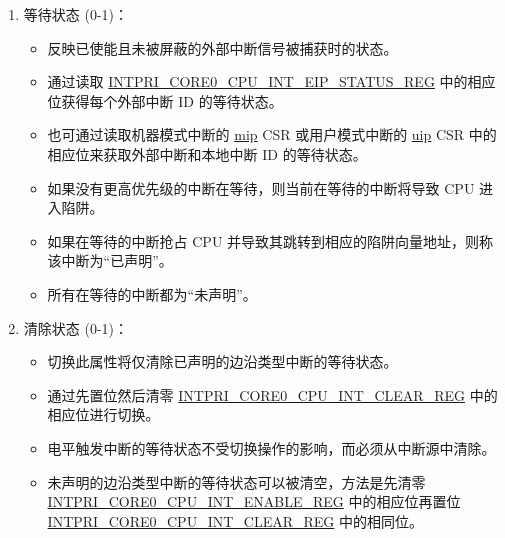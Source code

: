 \documentclass[main\_\_CN.tex]{subfiles}
\begin{document}
\begin{enumerate}
\begin{itemize}
        \item 通过写入外部中断 ID  的 \hyperref[regdesc:INTPRICORE0CPUINTPRINREG]{INTPRI\_CORE0\_CPU\_INT\_PRI\_\_REG} 进行配置。
        \item 优先级小于 \hyperref[regdesc:INTPRICORE0CPUINTTHRESHREG]{INTPRI\_CORE0\_CPU\_INT\_THRESH\_REG} 指定阈值的外部中断将被屏蔽。
        \item 优先级最低为 0，最高为 15。
        \item 具有相同优先级的中断通过其 ID 静态确定优先级，ID 越小，优先级越高。
        \item 本地 CLINT 中断具有静态的优先级，因此保留了相应的优先级寄存器。
        \item 本地 CLINT 中断在两种模式下均不会被优先级阈值屏蔽。
    \end{itemize}
    \item 等待状态 (0-1)：
    \begin{itemize}
        \item 反映已使能且未被屏蔽的外部中断信号被捕获时的状态。
        \item 通过读取 \hyperref[regdesc:INTPRICORE0CPUINTEIPSTATUSREG]{INTPRI\_CORE0\_CPU\_INT\_EIP\_STATUS\_REG} 中的相应位获得每个外部中断 ID 的等待状态。
        \item 也可通过读取机器模式中断的 \hyperref[regdesc:MIP]{mip} CSR 或用户模式中断的 \hyperref[regdesc:UIP]{uip} CSR 中的相应位来获取外部中断和本地中断 ID 的等待状态。
        \item 如果没有更高优先级的中断在等待，则当前在等待的中断将导致 CPU 进入陷阱。
        \item 如果在等待的中断抢占 CPU 并导致其跳转到相应的陷阱向量地址，则称该中断为“已声明”。
        \item 所有在等待的中断都为“未声明”。
    \end{itemize}
    \item 清除状态 (0-1)：
    \begin{itemize}
        \item 切换此属性将仅清除已声明的边沿类型中断的等待状态。
        \item 通过先置位然后清零 \hyperref[regdesc:INTPRICORE0CPUINTCLEARREG]{INTPRI\_CORE0\_CPU\_INT\_CLEAR\_REG} 中的相应位进行切换。
        \item 电平触发中断的等待状态不受切换操作的影响，而必须从中断源中清除。
        \item 未声明的边沿类型中断的等待状态可以被清空，方法是先清零 \hyperref[regdesc:INTPRICORE0CPUINTENABLEREG]{INTPRI\_CORE0\_CPU\_INT\_ENABLE\_REG} 中的相应位再置位 \hyperref[regdesc:INTPRICORE0CPUINTCLEARREG]{INTPRI\_CORE0\_CPU\_INT\_CLEAR\_REG} 中的相同位。
    \end{itemize}
\end{enumerate}
\end{document}
